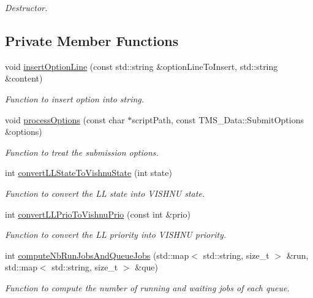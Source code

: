 \begin{DoxyCompactItemize}
\begin{DoxyCompactList}\small\item\em Destructor. \item\end{DoxyCompactList}\end{DoxyCompactItemize}
\subsection*{Private Member Functions}
\begin{DoxyCompactItemize}
\item 
void \hyperlink{classLLServer_a12ec697d6b846611c1e67ac1057d4ee0}{insertOptionLine} (const std::string \&optionLineToInsert, std::string \&content)
\begin{DoxyCompactList}\small\item\em Function to insert option into string. \item\end{DoxyCompactList}\item 
void \hyperlink{classLLServer_a54487bfb5d744a3b892e22127f3643ea}{processOptions} (const char $\ast$scriptPath, const TMS\_\-Data::SubmitOptions \&options)
\begin{DoxyCompactList}\small\item\em Function to treat the submission options. \item\end{DoxyCompactList}\item 
int \hyperlink{classLLServer_a0691e56eda4540ad4379a60ce1e5f3f5}{convertLLStateToVishnuState} (int state)
\begin{DoxyCompactList}\small\item\em Function to convert the LL state into VISHNU state. \item\end{DoxyCompactList}\item 
int \hyperlink{classLLServer_a8649f7c42ad24f66215a63d12e2d54a6}{convertLLPrioToVishnuPrio} (const int \&prio)
\begin{DoxyCompactList}\small\item\em Function to convert the LL priority into VISHNU priority. \item\end{DoxyCompactList}\item 
int \hyperlink{classLLServer_a3a9587a14a7cfb5e308b0f8173649cf9}{computeNbRunJobsAndQueueJobs} (std::map$<$ std::string, size\_\-t $>$ \&run, std::map$<$ std::string, size\_\-t $>$ \&que)
\begin{DoxyCompactList}\small\item\em Function to compute the number of running and waiting jobs of each queue. \item\end{DoxyCompactList}\end{DoxyCompactItemize}
